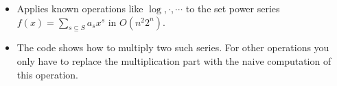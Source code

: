 \begin{itemize}
	\item Applies known operations like $\log, \cdot, \cdots$ to the set power series $f(x) = \sum_{s\subseteq S}a_sx^s$ in $O(n^2 2^n)$.
  \item The code shows how to multiply two such series. For other operations you only have to replace the multiplication part with the naive computation of this operation.
\end{itemize}